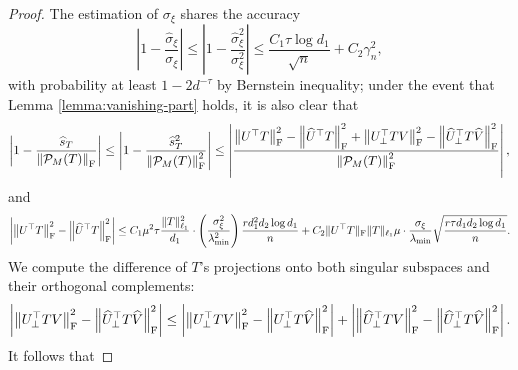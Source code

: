\documentclass[12pt]{article}
\newcommand{\tF}{{\rm F}}
\newcommand{\abs}[1]{\left\lvert#1\right\rvert}
\newcommand{\norm}[1]{\left\lVert#1\right\rVert}
\newcommand{\cP}{\mathcal{P}}
\theoremstyle{plain}
\begin{document}
\begin{proof}
The estimation of $\sigma_\xi$ shares the accuracy 
$$
\left|1-\frac{\widehat{\sigma}_{\xi}}{\sigma_{\xi}}\right| \leq\left|1-\frac{\widehat{\sigma}_{\xi}^2}{\sigma_{\xi}^2}\right| \leq \frac{C_1 \tau \log d_1}{\sqrt{n}}+C_2 \gamma_n^2,
$$
with probability at least $1-2 d^{-\tau}$ by Bernstein inequality; under the event that Lemma \ref{lemma:vanishing-part} holds, it is also clear that
$$
\left| 1- \frac{\widehat{s}_T }{\norm{\cP_M(T)}_\tF}\right| \le \abs{1- \frac{\widehat{s}_T^2 }{\norm{\cP_M(T)}_\tF^2}} \le \abs{\frac{\norm{U^\top T }_{\tF}^2 -\norm{\widehat{U}^\top T }_{\tF}^2 + \norm{ U_{\perp}^\top T V }^2_{\tF}- \norm{ \widehat U_{\perp}^\top T \widehat V }^2_{\tF} }{\norm{\cP_M(T)}_\tF^2} },
$$
and 
$$
\begin{aligned}
\abs{\norm{U^\top T }_{\tF}^2 -\norm{\widehat{U}^\top T }_{\tF}^2} \leq C_1 \mu^2\tau \frac{\|T\|_{\ell_1}^2}{d_1} \cdot\left(\frac{\sigma_{\xi}^2}{\lambda_{\min}^2}\right) \frac{r d_1^2 d_2 \log d_1}{n}+C_2\| U^\top T\|_{\mathrm{F}}\|T\|_{\ell_1} \mu \cdot \frac{\sigma_{\xi}}{\lambda_{\min}} \sqrt{\frac{r\tau d_1 d_2 \log d_1}{n}}.
\end{aligned}
$$
We compute the difference of $T$'s projections onto both singular subspaces and their orthogonal complements: 
$$
\abs{\norm{ U_{\perp}^\top T V }^2_{\tF}- \norm{ \widehat U_{\perp}^\top T \widehat V }^2_{\tF}} \le \abs{\norm{ U_{\perp}^\top T V }^2_{\tF}- \norm{  U_{\perp}^\top T \widehat V }^2_{\tF}} +\abs{\norm{ \widehat U_{\perp}^\top T V }^2_{\tF}- \norm{ \widehat U_{\perp}^\top T \widehat V }^2_{\tF}}.
$$
It follows that 


\end{proof}
\end{document}
